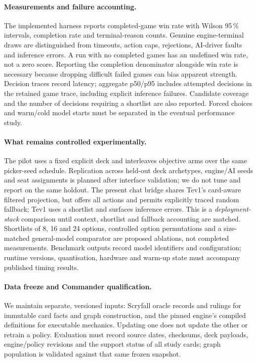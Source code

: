 \documentclass[11pt,a4paper]{article}
\theoremstyle{definition}
\theoremstyle{plain}
\begin{document}
\paragraph{Measurements and failure accounting.}
The implemented harness reports completed-game win rate with Wilson
95\,\% intervals, completion rate and terminal-reason counts. Genuine
engine-terminal draws are distinguished from timeouts, action caps,
rejections, AI-driver faults and inference errors. A run with no completed
games has an undefined win rate, not a zero score. Reporting the completion
denominator alongside win rate is necessary because dropping difficult
failed games can bias apparent strength. Decision traces record latency;
aggregate p50/p95 includes attempted decisions in the retained game trace,
including explicit inference failures. Candidate coverage and the number
of decisions requiring a shortlist are also reported. Forced choices and
warm/cold model starts must be separated in the eventual performance study.

\paragraph{What remains controlled experimentally.}
The pilot uses a fixed explicit deck and interleaves objective arms over
the same picker-seed schedule. Replication across held-out deck archetypes,
engine/AI seeds and seat assignments is planned after interface validation;
we do not tune and report on the same holdout. The present chat bridge
shares Tev1's card-aware filtered projection, but offers all actions and
permits explicitly traced random fallback; Tev1 uses a shortlist and surfaces
inference errors. This is a
\emph{deployment-stack} comparison until context, shortlist and fallback
accounting are matched. Shortlists of 8, 16 and 24 options, controlled
option permutations and a size-matched general-model comparator are
proposed ablations, not completed measurements. Benchmark outputs record
model identifiers and configuration; runtime versions, quantisation,
hardware and warm-up state must accompany published timing results.

\paragraph{Data freeze and Commander qualification.}
We maintain separate, versioned inputs: Scryfall oracle records and rulings
for immutable card facts and graph construction, and the pinned engine's
compiled definitions for executable mechanics. Updating one does not update
the other or retrain a policy. Evaluation must record source dates, checksums,
deck payloads, engine/policy revisions and the support status of all study
cards; graph population is validated against that same frozen snapshot.
\end{document}
